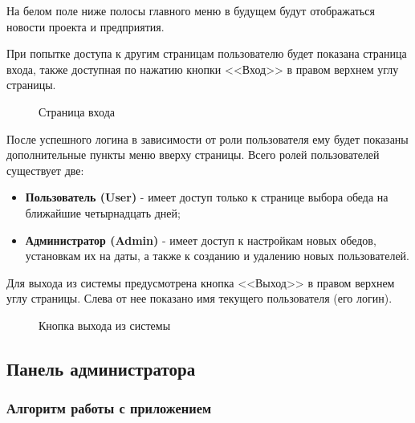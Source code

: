 \documentclass[a4paper]{article}
\begin{document}
На белом поле ниже полосы главного меню в будущем будут отображаться новости проекта и предприятия.

При попытке доступа к другим страницам пользователю будет показана страница входа, также доступная по нажатию кнопки <<Вход>> в правом верхнем углу страницы.

\begin{figure}[h]
\caption{Страница входа}
\label{fig:image3}
\end{figure}

После успешного логина в зависимости от роли пользователя ему будет показаны дополнительные пункты меню вверху страницы. Всего ролей пользователей существует две:

\begin{itemize}
\setlength{\itemsep}{-2mm}
	\item\textbf{Пользователь (User)} - имеет доступ только к странице выбора обеда на ближайшие четырнадцать дней;
	\item\textbf{Администратор (Admin)} - имеет доступ к настройкам новых обедов, установкам их на даты, а также к созданию и удалению новых пользователей.
\end{itemize}

Для выхода из системы предусмотрена кнопка <<Выход>> в правом верхнем углу страницы. Слева от нее показано имя текущего пользователя (его логин).

\begin{figure}[h]
\caption{Кнопка выхода из системы}
\label{fig:image4}
\end{figure}

\subsection{Панель администратора}

\subsubsection{Алгоритм работы с приложением}
\end{document}
